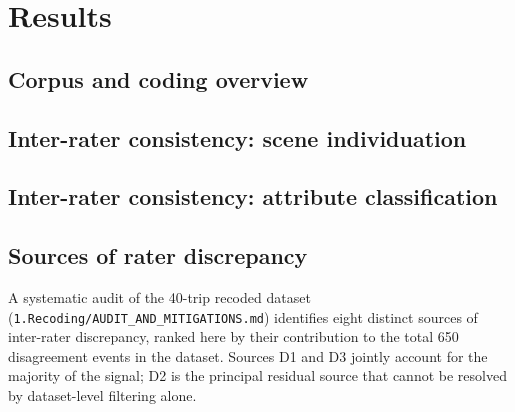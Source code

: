 \section{Results}
\label{sec:results}


\subsection{Corpus and coding overview}

\subsection{Inter-rater consistency: scene individuation}

\subsection{Inter-rater consistency: attribute classification}

\subsection{Sources of rater discrepancy}
\label{sec:discrepancy-sources}

A systematic audit of the 40-trip recoded dataset (\texttt{1.Recoding/AUDIT\_AND\_MITIGATIONS.md}) identifies eight distinct sources of inter-rater discrepancy, ranked here by their contribution to the total 650 disagreement events in the dataset. Sources D1 and D3 jointly account for the majority of the signal; D2 is the principal residual source that cannot be resolved by dataset-level filtering alone.

